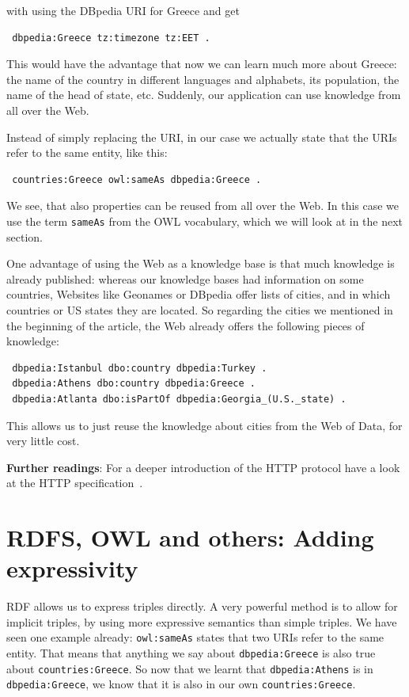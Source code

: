\documentclass{IOS-Book-Article}
\begin{document}
with using the DBpedia URI for Greece and get

\begin{verbatim}
 dbpedia:Greece tz:timezone tz:EET .
\end{verbatim}

This would have the advantage that now we can learn much more about Greece: the name of the country in different languages and alphabets, its population, the name of the head of state, etc.
Suddenly, our application can use knowledge from all over the Web.

Instead of simply replacing the URI, in our case we actually state that the URIs refer to the same entity, like this:

\begin{verbatim}
 countries:Greece owl:sameAs dbpedia:Greece .
\end{verbatim}

We see, that also properties can be reused from all over the Web.
In this case we use the term \texttt{sameAs} from the OWL vocabulary, which we will look at in the next section.

One advantage of using the Web as a knowledge base is that much knowledge is already published:
whereas our knowledge bases had information on some countries, Websites like Geonames or DBpedia offer lists of cities, and in which countries or US states they are located.
So regarding the cities we mentioned in the beginning of the article, the Web already offers the following pieces of knowledge:

\begin{verbatim}
 dbpedia:Istanbul dbo:country dbpedia:Turkey .
 dbpedia:Athens dbo:country dbpedia:Greece .
 dbpedia:Atlanta dbo:isPartOf dbpedia:Georgia_(U.S._state) .
\end{verbatim}

This allows us to just reuse the knowledge about cities from the Web of Data, for very little cost.

\medskip

\textbf{Further readings}:
For a deeper introduction of the HTTP protocol have a look at the HTTP specification~\cite{http}.

\section{RDFS, OWL and others: Adding expressivity}
\label{rdfs}

RDF allows us to express triples directly.
A very powerful method is to allow for implicit triples, by using more expressive semantics than simple triples.
We have seen one example already: \texttt{owl:sameAs} states that two URIs refer to the same entity.
That means that anything we say about \texttt{dbpedia:Greece} is also true about \texttt{countries:Greece}.
So now that we learnt that \texttt{dbpedia:Athens} is in \texttt{dbpedia:Greece}, we know that it is also in our own \texttt{countries:Greece}.
\end{document}
